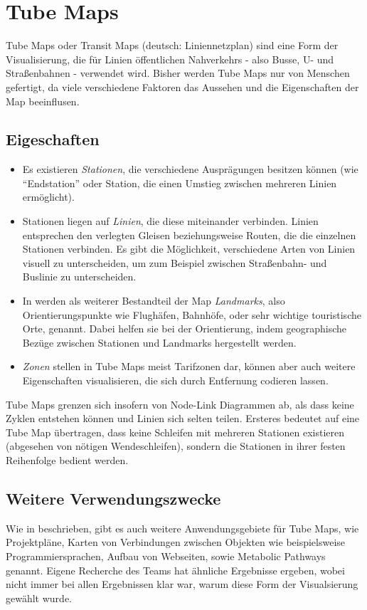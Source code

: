 \documentclass[color,german]{tudbook}
\begin{document}
\section{Tube Maps}
Tube Maps oder Transit Maps (deutsch: Liniennetzplan) sind eine Form der Visualisierung, die für Linien öffentlichen Nahverkehrs - also Busse, U- und Straßenbahnen - verwendet wird. Bisher werden Tube Maps nur von Menschen gefertigt, da viele verschiedene Faktoren das Aussehen und die Eigenschaften der Map beeinflusen.  
\subsection{Eigeschaften}
\begin{itemize}
\item Es existieren \emph{Stationen}, die verschiedene Ausprägungen besitzen können (wie "`Endstation"' oder Station, die einen Umstieg zwischen mehreren Linien ermöglicht). 
\item Stationen liegen auf \emph{Linien}, die diese miteinander verbinden. Linien entsprechen den verlegten Gleisen beziehungsweise Routen, die die einzelnen Stationen verbinden. Es gibt die Möglichkeit, verschiedene Arten von Linien visuell zu unterscheiden, um zum Beispiel zwischen Straßenbahn- und Buslinie zu unterscheiden.
\item In \cite{automaticlayoutmetro08} werden als weiterer Bestandteil der Map \emph{Landmarks}, also Orientierungspunkte wie Flughäfen, Bahnhöfe, oder sehr wichtige touristische Orte, genannt. Dabei helfen sie bei der Orientierung, indem geographische Bezüge zwischen Stationen und Landmarks hergestellt werden.
\item \emph{Zonen} stellen in Tube Maps meist Tarifzonen dar, können aber auch weitere Eigenschaften visualisieren, die sich durch Entfernung codieren lassen. 
\end{itemize}
Tube Maps grenzen sich insofern von Node-Link Diagrammen ab, als dass keine Zyklen entstehen können und Linien sich selten teilen. Ersteres bedeutet auf eine Tube Map übertragen, dass keine Schleifen mit mehreren Stationen existieren (abgesehen von nötigen Wendeschleifen), sondern die Stationen in ihrer festen Reihenfolge bedient werden. 


\subsection{Weitere Verwendungszwecke}
\label{tm:verwendungszwecke}
Wie in \cite{automaticlayoutmetro08} beschrieben, gibt es auch weitere Anwendungsgebiete für Tube Maps, wie Projektpläne, Karten von Verbindungen zwischen Objekten wie beispielsweise Programmiersprachen, Aufbau von Webseiten, sowie Metabolic Pathways genannt. Eigene Recherche des Teams hat ähnliche Ergebnisse ergeben, wobei nicht immer bei allen Ergebnissen klar war, warum diese Form der Visualsierung gewählt wurde. 
\end{document}
